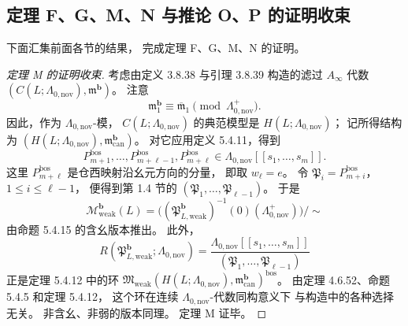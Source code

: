 
\subsection{定理 F、G、M、N 与推论 O、P 的证明收束}
\label{subsec:5-4-6}

下面汇集前面各节的结果，
完成定理 F、G、M、N 的证明。

\begin{proof}[定理 M 的证明收束]
考虑由定义 3.8.38 与引理 3.8.39
构造的滤过 $A_\infty$ 代数
$(C(L;\Lambda_{0,\mathrm{nov}}),
\mathfrak m^{\mathbf b})$。
注意
\[
\mathfrak m^{\mathbf b}_1
\equiv\overline{\mathfrak m}_1
\pmod{\Lambda^+_{0,\mathrm{nov}}}.
\]
因此，作为 $\Lambda_{0,\mathrm{nov}}$-模，
$C(L;\Lambda_{0,\mathrm{nov}})$
的典范模型是
$H(L;\Lambda_{0,\mathrm{nov}})$；
记所得结构为
$(H(L;\Lambda_{0,\mathrm{nov}}),
\mathfrak m_{\mathrm{can}}^{\mathbf b})$。
对它应用定义 5.4.11，得到
\[
P_{m+1}^{\mathrm{bos}},
\ldots,P_{m+\ell-1}^{\mathrm{bos}},
P_{m+\ell}^{\mathrm{bos}}
\in\Lambda_{0,\mathrm{nov}}[[s_1,\ldots,s_m]].
\]
这里 $P_{m+\ell}^{\mathrm{bos}}$
是仓西映射沿幺元方向的分量，
即取 $w_\ell=e$。
令
$\mathfrak P_i=P_{m+i}^{\mathrm{bos}}$，
$1\le i\le\ell-1$，
便得到第 1.4 节的
$(\mathfrak P_1,\ldots,\mathfrak P_{\ell-1})$。
于是
\[
\mathcal M_{\mathrm{weak}}^{\mathbf b}(L)
=\bigl(
(\mathfrak P_{L,\mathrm{weak}}^{\mathbf b})^{-1}
(0)(\Lambda^+_{0,\mathrm{nov}})
\bigr)/{\sim}
\]
由命题 5.4.15 的含幺版本推出。
此外，
\[
R(\mathfrak P_{L,\mathrm{weak}}^{\mathbf b};
\Lambda_{0,\mathrm{nov}})
=
\frac{\Lambda_{0,\mathrm{nov}}[[s_1,\ldots,s_m]]}
{(\mathfrak P_1,\ldots,\mathfrak P_{\ell-1})}
\]
正是定理 5.4.12 中的环
$\mathfrak M_{\mathrm{weak}}
(H(L;\Lambda_{0,\mathrm{nov}}),
\mathfrak m_{\mathrm{can}}^{\mathbf b})^{\mathrm{bos}}$。
由定理 4.6.52、命题 5.4.5
和定理 5.4.12，
这个环在连续
$\Lambda_{0,\mathrm{nov}}$-代数同构意义下
与构造中的各种选择无关。
非含幺、非弱的版本同理。
定理 M 证毕。
\end{proof}

